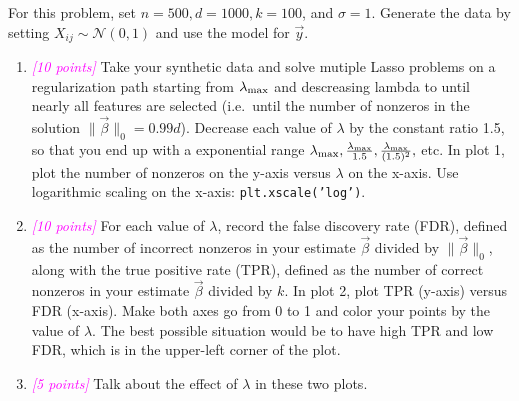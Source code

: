 \documentclass{article}
\newcommand{\points}[1]{\small\textcolor{magenta}{\emph{[#1 points]}} \normalsize}
\begin{document}
\vspace{1em}
For this problem, set $n = 500, d= 1000, k=100$, and $\sigma =1$.
Generate the data by setting $X_{ij} \sim \mathcal{N}(0,1)$
and use the model for $\vec y$.

\begin{enumerate}
\item \points{10} Take your synthetic data and solve mutiple Lasso problems
  on a regularization path starting from $\lambda_{\rm max}$ 
  and descreasing lambda to until nearly all features are selected
  (i.e.\ until the number of nonzeros in the solution $\| \vec \beta \|_0 = 0.99 d$).
  Decrease each value of $\lambda$ by the constant ratio 1.5,
  so that you end up with a exponential range
  $\lambda_{\rm max}, \frac{\lambda_{\rm max}}{1.5}, 
  \frac{\lambda_{\rm max}}{(1.5)^2},$ etc.
  In plot 1, plot the number of nonzeros on the y-axis versus $\lambda$ on the x-axis.
  Use logarithmic scaling on the x-axis: {\tt plt.xscale('log')}.
\item \points{10} For each value of $\lambda$, record the false discovery rate (FDR),
  defined as the number of incorrect nonzeros in your estimate $\vec \beta$
  divided by $\| \vec \beta \|_0$,
  along with the true positive rate (TPR),
  defined as the number of correct nonzeros in your estimate $\vec \beta$
  divided by $k$.
  In plot 2, plot TPR (y-axis) versus FDR (x-axis). 
  Make both axes go from 0 to 1 and color your points by the value of $\lambda$.
  The best possible situation would be to have high TPR and low FDR, 
  which is in the upper-left corner of the plot.
\item \points{5} Talk about the effect of $\lambda$ in these two plots.
\end{enumerate}
\end{document}
